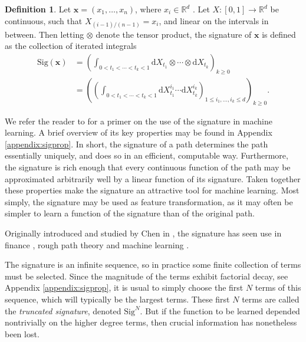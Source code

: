 \documentclass{article}
\theoremstyle{plain}
\theoremstyle{definition}
\newtheorem{definition}[thm]{Definition}
\begin{document}
	\begin{definition}
		Let $\mathbf x = (x_1, \ldots, x_n)$, where $x_i \in \mathbb R^d$%
		. Let $X \colon [0, 1] \to \mathbb R^d$ be continuous, such that $X_{(i -1) / (n - 1)} = x_i$, and linear on the intervals in between. Then letting $\otimes$ denote the tensor product, the signature of $\mathbf x$ is defined as the collection of iterated integrals
		\begin{align*}
		\mathrm{Sig}(\mathbf x) &= \left( \int_{0 < t_1 < \cdots < t_k < 1} \mathrm dX_{t_1} \otimes \cdots \otimes  \mathrm dX_{t_k} \right)_{k \geq 0} \\
		&= \left(\left( \int_{0 < t_1 < \cdots < t_k < 1} \mathrm dX^{i_1}_{t_1} \cdots \mathrm dX^{i_k}_{t_k} \right)_{1 \leq i_1, \ldots, i_k \leq d}\right)_{k\geq 0}.
		\end{align*}
	\end{definition}	
	We refer the reader to \cite{primer2016} for a primer on the use of the signature in machine learning. A brief overview of its key properties may be found in Appendix \ref{appendix:sigprop}. In short, the signature of a path determines the path essentially uniquely, and does so in an efficient, computable way. Furthermore, the signature is rich enough that every continuous function of the path may be approximated arbitrarily well by a linear function of its signature. Taken together these properties make the signature an attractive tool for machine learning. Most simply, the signature may be used as feature transformation, as it may often be simpler to learn a function of the signature than of the original path.
	
	Originally introduced and studied by Chen in \cite{Chen54, Chen57, Chen58}, the signature has seen use in finance \cite{TODO, TODO}, rough path theory \cite{lyons1998differential, FritzVictoir10} and machine learning \cite{yang2015chinese, xie2018learning, yang2016dropsample, yang2016deepwriterid, li2017lpsnet, yang2017leveraging, yang2016rotation, kiraly2016kernels, chevyrev2018signature}.
	
	The signature is an infinite sequence, so in practice some finite collection of terms must be selected. Since the magnitude of the terms exhibit factorial decay, see Appendix \ref{appendix:sigprop}, it is usual \cite{TODO} to simply choose the first $N$ terms of this sequence, which will typically be the largest terms. These first $N$ terms are called the \emph{truncated signature}, denoted $\mathrm{Sig}^N$. But if the function to be learned depended nontrivially on the higher degree terms, then crucial information has nonetheless been lost.
	
\end{document}
